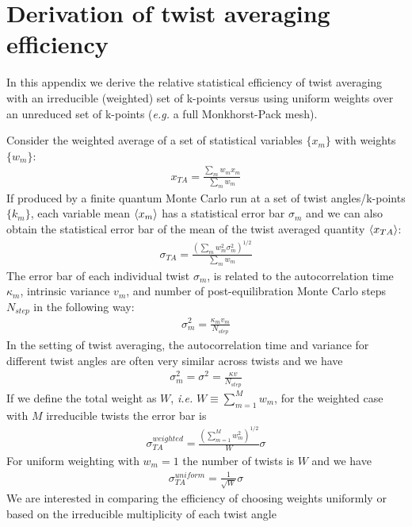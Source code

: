
\appendix

\chapter{Derivation of twist averaging efficiency}
\label{sec:app_ta_efficiency}
In this appendix we derive the relative statistical efficiency of 
twist averaging with an irreducible (weighted) set of k-points 
versus using uniform weights over an unreduced set of k-points 
(\emph{e.g.} a full Monkhorst-Pack mesh).

Consider the weighted average of a set of statistical variables 
$\{x_m\}$ with weights $\{w_m\}$:
\begin{align}
  x_{TA} = \frac{\sum_mw_mx_m}{\sum_mw_m}
\end{align} 
If produced by a finite quantum Monte Carlo run at a set of 
twist angles/k-points $\{k_m\}$, each variable mean $\langle x_m \rangle$ 
has a statistical error bar $\sigma_m$ and we can also obtain 
the statistical error bar of the mean of the twist averaged 
quantity $\langle x_{TA} \rangle$:
\begin{align}
  \sigma_{TA} = \frac{\left(\sum_mw_m^2\sigma_m^2\right)^{1/2}}{\sum_mw_m}
\end{align}
The error bar of each individual twist $\sigma_m$, is related to the 
autocorrelation time $\kappa_m$,  intrinsic variance $v_m$, and number 
of post-equilibration Monte Carlo steps $N_{step}$ in the following way:
\begin{align}
  \sigma_m^2=\frac{\kappa_mv_m}{N_{step}}
\end{align}
In the setting of twist averaging, the autocorrelation time and 
variance for different twist angles are often very similar across 
twists and we have
\begin{align}
  \sigma_m^2=\sigma^2=\frac{\kappa v}{N_{step}}
\end{align} 
If we define the total weight as $W$, \emph{i.e.} $W\equiv\sum_{m=1}^Mw_m$, 
for the weighted case with $M$ irreducible twists the error bar is
\begin{align}
  \sigma_{TA}^{weighted}=\frac{\left(\sum_{m=1}^Mw_m^2\right)^{1/2}}{W}\sigma
\end{align}
For uniform weighting with $w_m=1$ the number of twists is $W$ and 
we have
\begin{align}
  \sigma_{TA}^{uniform}=\frac{1}{\sqrt{W}}\sigma
\end{align}
We are interested in comparing the efficiency of choosing weights 
uniformly or based on the irreducible multiplicity of each twist angle 
